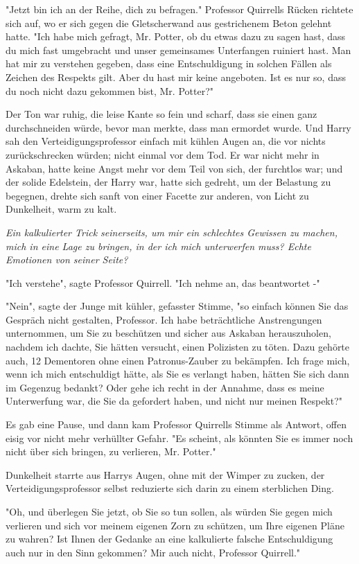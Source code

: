 {"Jetzt bin ich an der Reihe, dich zu befragen." Professor Quirrells Rücken richtete sich auf, wo er sich gegen die Gletscherwand aus gestrichenem Beton gelehnt hatte. "Ich habe mich gefragt, Mr. Potter, ob du etwas dazu zu sagen hast, dass du mich fast umgebracht und unser gemeinsames Unterfangen ruiniert hast. Man hat mir zu verstehen gegeben, dass eine Entschuldigung in solchen Fällen als Zeichen des Respekts gilt. Aber du hast mir keine angeboten. Ist es nur so, dass du noch nicht dazu gekommen bist, Mr. Potter?"

Der Ton war ruhig, die leise Kante so fein und scharf, dass sie einen ganz durchschneiden würde, bevor man merkte, dass man ermordet wurde. Und Harry sah den Verteidigungsprofessor einfach mit kühlen Augen an, die vor nichts zurückschrecken würden; nicht einmal vor dem Tod. Er war nicht mehr in Askaban, hatte keine Angst mehr vor dem Teil von sich, der furchtlos war; und der solide Edelstein, der Harry war, hatte sich gedreht, um der Belastung zu begegnen, drehte sich sanft von einer Facette zur anderen, von Licht zu Dunkelheit, warm zu kalt.

\emph{Ein kalkulierter Trick seinerseits, um mir ein schlechtes Gewissen zu machen, mich in eine Lage zu bringen, in der ich mich unterwerfen muss? Echte Emotionen von seiner Seite?}

"Ich verstehe", sagte Professor Quirrell. "Ich nehme an, das beantwortet -"

"Nein", sagte der Junge mit kühler, gefasster Stimme, "so einfach können Sie das Gespräch nicht gestalten, Professor. Ich habe beträchtliche Anstrengungen unternommen, um Sie zu beschützen und sicher aus Askaban herauszuholen, nachdem ich dachte, Sie hätten versucht, einen Polizisten zu töten. Dazu gehörte auch, 12 Dementoren ohne einen Patronus-Zauber zu bekämpfen. Ich frage mich, wenn ich mich entschuldigt hätte, als Sie es verlangt haben, hätten Sie sich dann im Gegenzug bedankt? Oder gehe ich recht in der Annahme, dass es meine Unterwerfung war, die Sie da gefordert haben, und nicht nur meinen Respekt?"

Es gab eine Pause, und dann kam Professor Quirrells Stimme als Antwort, offen eisig vor nicht mehr verhüllter Gefahr. "Es scheint, als könnten Sie es immer noch nicht über sich bringen, zu verlieren, Mr. Potter."

Dunkelheit starrte aus Harrys Augen, ohne mit der Wimper zu zucken, der Verteidigungsprofessor selbst reduzierte sich darin zu einem sterblichen Ding.

"Oh, und überlegen Sie jetzt, ob Sie so tun sollen, als würden Sie gegen mich verlieren und sich vor meinem eigenen Zorn zu schützen, um Ihre eigenen Pläne zu wahren? Ist Ihnen der Gedanke an eine kalkulierte falsche Entschuldigung auch nur in den Sinn gekommen? Mir auch nicht, Professor Quirrell."

}
